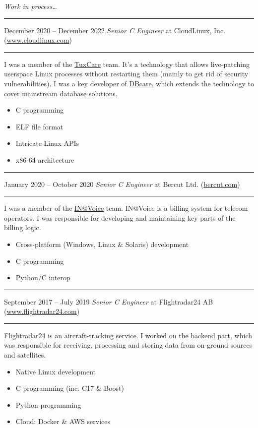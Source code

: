 \documentclass[11pt]{article}
\newcommand\CXX{C\nolinebreak[4]\hspace{-.05em}\raisebox{.4ex}{\relsize{-3}{\textbf{++}}}}
\newcommand\CvSmallSkipLength{0.5em}
\newcommand\CvSkip[1]{\vspace{#1}}
\newcommand\CvSmallSkip{\CvSkip{\CvSmallSkipLength}}
\newcommand\CvRule{\begingroup\color{CvRuleColor}\hrule\endgroup}
\newcommand\CvWorkplaceHeader[5]{\begingroup%
  \CvRule\nopagebreak%
  \fboxsep0pt%
  \colorbox{CvWorkplaceHeaderColor}{%
    \begin{minipage}{\linewidth-2\fboxsep}%
\CvSmallSkip%
#1 -- #2 \hfill \textit{#3} at #4 (\href{http://#5/}{#5})%
\CvSmallSkip%
    \end{minipage}%
  }%
  \CvRule%
\endgroup%
}
\newenvironment{CvWorkplaceDescription}{%
    \begingroup\setlength\parskip{\CvSmallSkipLength}%
  }{%
    \CvSmallSkip\endgroup%
  }
\newcommand\CvWIP{\textit{Work in process\ldots}}
\begin{document}
\begin{CvWorkplaceDescription}
\CvWIP
\end{CvWorkplaceDescription}

\CvWorkplaceHeader{December 2020}{December 2022}{Senior {\CXX} Engineer}{CloudLinux, Inc.}{www.cloudlinux.com}

\begin{CvWorkplaceDescription}
I was a member of the \href{https://tuxcare.com/}{TuxCare} team.
It's a technology that allows live-patching userspace Linux processes without
restarting them (mainly to get rid of security vulnerabilities).
I was a key developer of \href{https://tuxcare.com/live-patching-services/databasecare/}{DBcare},
which extends the technology to cover mainstream database solutions.

\begin{itemize}[noitemsep]
  \item C programming
  \item ELF file format
  \item Intricate Linux APIs
  \item x86-64 architecture
\end{itemize}
\end{CvWorkplaceDescription}

\CvWorkplaceHeader{January 2020}{October 2020}{Senior {\CXX} Engineer}{Bercut Ltd.}{bercut.com}

\begin{CvWorkplaceDescription}
I was a member of the \href{https://bercut.com/products/in-voice/}{IN@Voice}
team.
IN@Voice is a billing system for telecom operators.
I was responsible for developing and maintaining key parts of the billing
logic.

\begin{itemize}[noitemsep]
  \item Cross-platform (Windows, Linux \& Solaris) development
  \item {\CXX} programming
  \item Python/{\CXX} interop
\end{itemize}
\end{CvWorkplaceDescription}

\CvWorkplaceHeader{September 2017}{July 2019}{Senior {\CXX} Engineer}{Flightradar24 AB}{www.flightradar24.com}

\begin{CvWorkplaceDescription}
Flightradar24 is an aircraft-tracking service.
I worked on the backend part, which was responsible for receiving, processing
and storing data from on-ground sources and satellites.

\begin{itemize}[noitemsep]
  \item Native Linux development
  \item {\CXX} programming (inc. {\CXX}17 \& Boost)
  \item Python programming
  \item Cloud: Docker \& AWS services
\end{itemize}
\end{CvWorkplaceDescription}
\end{document}
